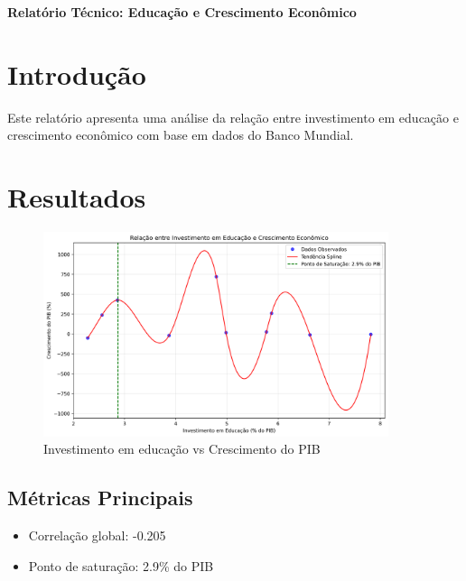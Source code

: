 \documentclass[12pt]{article}
\begin{document}
\begin{center}
    \LARGE\textbf{Relatório Técnico: Educação e Crescimento Econômico}
\end{center}

\section{Introdução}
Este relatório apresenta uma análise da relação entre investimento em educação e crescimento econômico com base em dados do Banco Mundial.

\section{Resultados}
\begin{figure}[H]
    \centering
    \includegraphics[width=0.9\textwidth]{relacao_educacao_crescimento.png}
    \caption{Investimento em educação vs Crescimento do PIB}
\end{figure}

\subsection{Métricas Principais}
\begin{itemize}
    \item Correlação global: -0.205
    \item Ponto de saturação: 2.9\% do PIB
\end{itemize}
\end{document}
